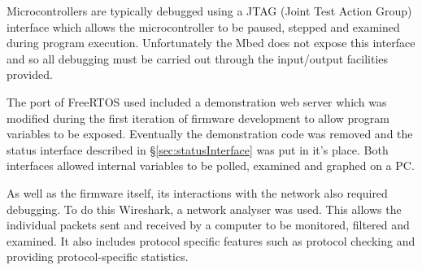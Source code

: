 			Microcontrollers are typically debugged using a JTAG (Joint Test Action
			Group) interface which allows the microcontroller to be paused, stepped
			and examined during program execution. Unfortunately the Mbed does not
			expose this interface and so all debugging must be carried out through the
			input/output facilities provided.
			
			The port of FreeRTOS used included a demonstration web server which was
			modified during the first iteration of firmware development to allow
			program variables to be exposed. Eventually the demonstration code was
			removed and the status interface described in \S\ref{sec:statusInterface}
			was put in it's place. Both interfaces allowed internal variables to be
			polled, examined and graphed on a PC.
			
			As well as the firmware itself, its interactions with the network also
			required debugging. To do this Wireshark, a network analyser was used.
			This allows the individual packets sent and received by a computer to be
			monitored, filtered and examined. It also includes protocol specific
			features such as protocol checking and providing protocol-specific
			statistics.
